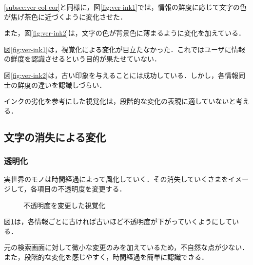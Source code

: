 \ref{subsec:ver-col-cor}と同様に，図\ref{fig:ver-ink1}では，情報の鮮度に応じて文字の色が焦げ茶色に近づくように変化させた．

また，図\ref{fig:ver-ink2}は，文字の色が背景色に薄まるように変化を加えている．

図\ref{fig:ver-ink1}は，視覚化による変化が目立たなかった．これではユーザに情報の鮮度を認識させるという目的が果たせていない．

図\ref{fig:ver-ink2}は，古い印象を与えることには成功している．しかし，各情報同士の鮮度の違いを認識しづらい．

インクの劣化を参考にした視覚化は，段階的な変化の表現に適していないと考える．

\subsection{文字の消失による変化}
\label{sec:ver-character}

\subsubsection{透明化}
\label{subsec:ver-chr-trp}

実世界のモノは時間経過によって風化していく．その消失していくさまをイメージして，各項目の不透明度を変更する．

\begin{figure}[htbp]
  \begin{center}
  \end{center}
  \caption{不透明度を変更した視覚化}
  \label{fig:ver-transparence}
\end{figure}

図\ref{fig:ver-transparence}は，各情報ごとに古ければ古いほど不透明度が下がっていくようにしている．

元の検索画面に対して微小な変更のみを加えているため，不自然な点が少ない．また，段階的な変化を感じやすく，時間経過を簡単に認識できる．

